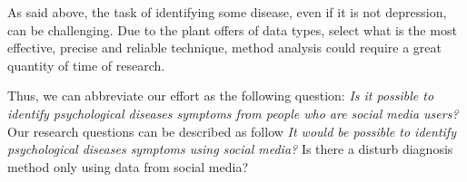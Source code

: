 As said above, the task of identifying some disease, even if it is not depression, can be challenging. Due to the plant offers of data types, select what is the most effective, precise and reliable technique, method analysis could require a great quantity of time of research.
 
Thus, we can abbreviate our effort as the following question: \emph{Is it possible to identify psychological diseases symptoms from people who are social media users?}
Our research questions can be described as follow
\textit{It would be possible to identify psychological diseases symptoms using social media?}
Is there a disturb diagnosis method only using data from social media? 






